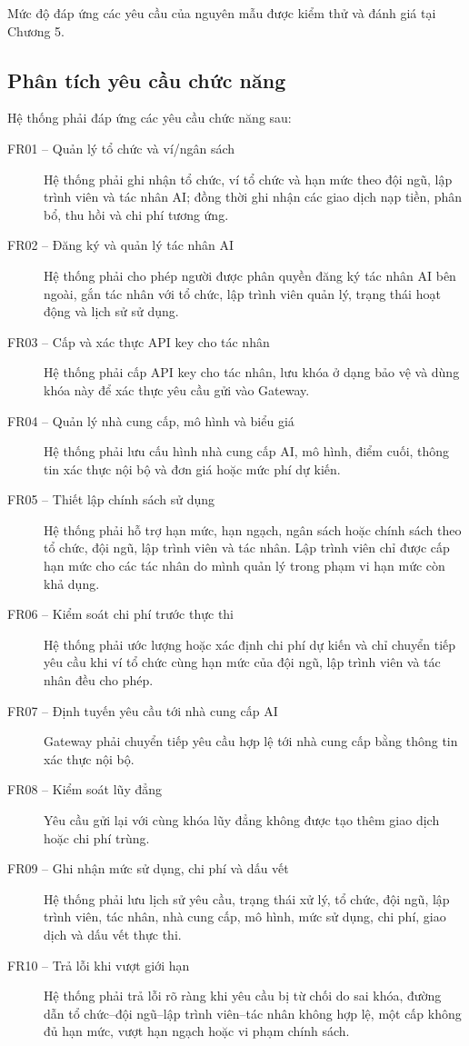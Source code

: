 Mức độ đáp ứng các yêu cầu của nguyên mẫu được kiểm thử và đánh giá tại Chương 5.


\subsection*{Phân tích yêu cầu chức năng}

Hệ thống phải đáp ứng các yêu cầu chức năng sau:

\begin{description}
    \item[FR01 -- Quản lý tổ chức và ví/ngân sách] Hệ thống phải ghi nhận tổ chức, ví tổ chức và hạn mức theo đội ngũ, lập trình viên và tác nhân AI; đồng thời ghi nhận các giao dịch nạp tiền, phân bổ, thu hồi và chi phí tương ứng.
    \item[FR02 -- Đăng ký và quản lý tác nhân AI] Hệ thống phải cho phép người được phân quyền đăng ký tác nhân AI bên ngoài, gắn tác nhân với tổ chức, lập trình viên quản lý, trạng thái hoạt động và lịch sử sử dụng.
    \item[FR03 -- Cấp và xác thực API key cho tác nhân] Hệ thống phải cấp API key cho tác nhân, lưu khóa ở dạng bảo vệ và dùng khóa này để xác thực yêu cầu gửi vào Gateway.
    \item[FR04 -- Quản lý nhà cung cấp, mô hình và biểu giá] Hệ thống phải lưu cấu hình nhà cung cấp AI, mô hình, điểm cuối, thông tin xác thực nội bộ và đơn giá hoặc mức phí dự kiến.
    \item[FR05 -- Thiết lập chính sách sử dụng] Hệ thống phải hỗ trợ hạn mức, hạn ngạch, ngân sách hoặc chính sách theo tổ chức, đội ngũ, lập trình viên và tác nhân. Lập trình viên chỉ được cấp hạn mức cho các tác nhân do mình quản lý trong phạm vi hạn mức còn khả dụng.
    \item[FR06 -- Kiểm soát chi phí trước thực thi] Hệ thống phải ước lượng hoặc xác định chi phí dự kiến và chỉ chuyển tiếp yêu cầu khi ví tổ chức cùng hạn mức của đội ngũ, lập trình viên và tác nhân đều cho phép.
    \item[FR07 -- Định tuyến yêu cầu tới nhà cung cấp AI] Gateway phải chuyển tiếp yêu cầu hợp lệ tới nhà cung cấp bằng thông tin xác thực nội bộ.
    \item[FR08 -- Kiểm soát lũy đẳng] Yêu cầu gửi lại với cùng khóa lũy đẳng không được tạo thêm giao dịch hoặc chi phí trùng.
    \item[FR09 -- Ghi nhận mức sử dụng, chi phí và dấu vết] Hệ thống phải lưu lịch sử yêu cầu, trạng thái xử lý, tổ chức, đội ngũ, lập trình viên, tác nhân, nhà cung cấp, mô hình, mức sử dụng, chi phí, giao dịch và dấu vết thực thi.
    \item[FR10 -- Trả lỗi khi vượt giới hạn] Hệ thống phải trả lỗi rõ ràng khi yêu cầu bị từ chối do sai khóa, đường dẫn tổ chức--đội ngũ--lập trình viên--tác nhân không hợp lệ, một cấp không đủ hạn mức, vượt hạn ngạch hoặc vi phạm chính sách.
\end{description}

